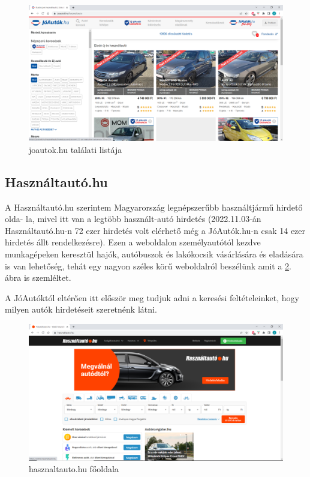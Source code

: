 \begin{figure}[h]
\centering
\includegraphics[scale=0.8]{images/joautok.png}
\caption{joautok.hu találati listája \cite{JoAuto}}
\label{fig:joautok}
\end{figure}

\subsection{Használtautó.hu}

A Használtautó.hu szerintem Magyarország legnépszerűbb használtjármű hirdető olda-
la, mivel itt van a legtöbb használt-autó hirdetés (2022.11.03-án Használtautó.hu-n 72 ezer hirdetés volt elérhető még a JóAutók.hu-n csak 14 ezer hirdetés állt rendelkezésre). Ezen a weboldalon személyautótól kezdve munkagépeken keresztül hajók, autóbuszok és lakókocsik vásárlására és eladására is van lehetőség, tehát egy nagyon széles körű weboldalról beszélünk amit a \ref{fig:hasznaltauto}. ábra is szemléltet.

A JóAutóktól eltérően itt először meg tudjuk adni a keresési feltételeinket, hogy milyen autók hirdetéseit szeretnénk látni.

\begin{figure}[h]
\centering
\includegraphics[scale=0.8]{images/hasznaltauto.png}
\caption{hasznaltauto.hu főoldala \cite{Hasznaltauto}}
\label{fig:hasznaltauto}
\end{figure}
\newpage

